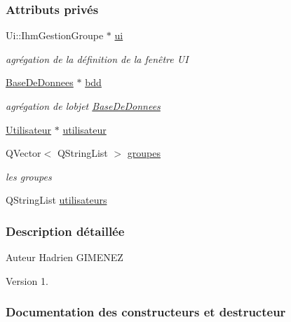 \subsubsection*{Attributs privés}
\begin{DoxyCompactItemize}
\item 
Ui\+::\+Ihm\+Gestion\+Groupe $\ast$ \hyperlink{class_ihm_gestion_groupe_a9785ad3dadc1d2cad8558ca8b682dffd}{ui}
\begin{DoxyCompactList}\small\item\em agrégation de la définition de la fenêtre UI \end{DoxyCompactList}\item 
\hyperlink{class_base_de_donnees}{Base\+De\+Donnees} $\ast$ \hyperlink{class_ihm_gestion_groupe_a4f0049a7046abe7530d7f7eaed7ed2bc}{bdd}
\begin{DoxyCompactList}\small\item\em agrégation de l\textquotesingle{}objet \hyperlink{class_base_de_donnees}{Base\+De\+Donnees} \end{DoxyCompactList}\item 
\hyperlink{class_utilisateur}{Utilisateur} $\ast$ \hyperlink{class_ihm_gestion_groupe_a87b9d242561e8bf7765aa14a5e124db1}{utilisateur}
\item 
Q\+Vector$<$ Q\+String\+List $>$ \hyperlink{class_ihm_gestion_groupe_af2d05c88db3e19452e70727446635bc4}{groupes}
\begin{DoxyCompactList}\small\item\em les groupes \end{DoxyCompactList}\item 
Q\+String\+List \hyperlink{class_ihm_gestion_groupe_a1f14e24cf672c5d0b6ae86084f758846}{utilisateurs}
\end{DoxyCompactItemize}


\subsubsection{Description détaillée}
\begin{DoxyAuthor}{Auteur}
Hadrien G\+I\+M\+E\+N\+EZ
\end{DoxyAuthor}
\begin{DoxyVersion}{Version}
1. 
\end{DoxyVersion}


\subsubsection{Documentation des constructeurs et destructeur}
\mbox{\label{class_ihm_gestion_groupe_a27632f9cf5b66f4403c3534ee0e0ad18}} 
